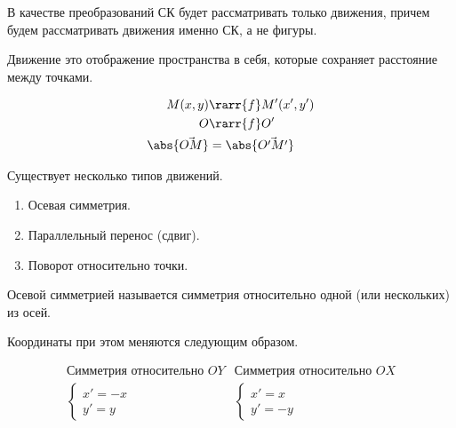 
В качестве преобразований СК будет рассматривать только движения, причем будем
рассматривать движения именно СК, а не фигуры.

\begin{definition}
  Движение это отображение пространства в себя, которые сохраняет расстояние
  между точками.

  \begin{equation*}
    \begin{aligned}
      M(x, y) & \rarr{f} M'(x', y')
    \\
      O & \rarr{f} O'
    \\
      \abs{\vec{OM}} & = \abs{\vec{O'M'}}
    \end{aligned}
  \end{equation*}
\end{definition}

Существует несколько типов движений.

\begin{enumerate}
\item
  Осевая симметрия.
\item
  Параллельный перенос (сдвиг).
\item
  Поворот относительно точки.
\end{enumerate}


\begin{definition}
  Осевой симметрией называется симметрия относительно одной (или нескольких) из
  осей.
\end{definition}

Координаты при этом меняются следующим образом.

\begin{equation*}
  \begin{array}{cc}
    \text{Симметрия относительно \(OY\)}
    &
    \text{Симметрия относительно \(OX\)}
  \\
    \begin{cases}
      x' = -x \\
      y' = y
    \end{cases}
    &
    \begin{cases}
      x' = x \\
      y' = -y
    \end{cases}
  \end{array}
\end{equation*}

